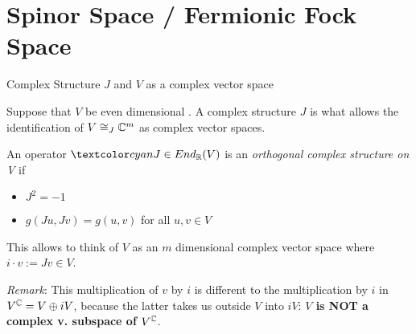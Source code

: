 \section{Spinor Space / Fermionic Fock Space}

\begin{frame}{Complex Structure $J$ and $V$ as a complex vector space} %
    
    Suppose that $V$ be even dimensional%
    . A complex structure $J$ is what allows the identification of $V \cong_J \mathbb C^m$ as complex vector spaces.
    
    \begin{definition}
    An operator $\defn{J} \in End_\RR(V)$ is an \emph{orthogonal complex structure on V} if 
        
        \begin{itemize}
            
        \item $J^2 = -1$
        
        \item $g(Ju, Jv) = g(u, v)$ for all $u, v \in V$
            
        \end{itemize}
    \end{definition}
    
    This allows to think of $V$ as an $m$ dimensional complex vector space where $i \cdot v := Jv \in V$.
    
    \emph{Remark}: This multiplication of $v$ by $i$ is different to the multiplication by $i$ in $V^\mathbb C = V \oplus iV$, because the latter takes us outside $V$ into $iV$: \textbf{$V$ is NOT a complex v. subspace of $V^\mathbb C$}.

\end{frame}

